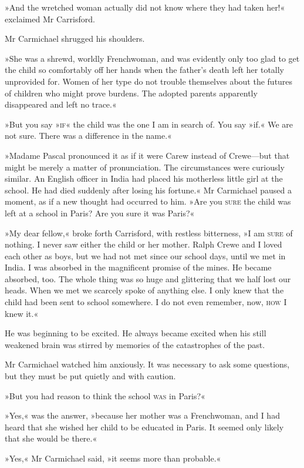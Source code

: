 »And the wretched woman actually did not know where they had taken her!« exclaimed Mr Carrisford.

Mr Carmichael shrugged his shoulders.

»She was a shrewd, worldly Frenchwoman, and was evidently only too glad to get the child so comfortably off her hands when the father's death left her totally unprovided for. Women of her type do not trouble themselves about the futures of children who might prove burdens. The adopted parents apparently disappeared and left no trace.«

»But you say »\textsc{if}« the child was the one I am in search of. You say »if.« We are not sure. There was a difference in the name.«

»Madame Pascal pronounced it as if it were Carew instead of Crewe—but that might be merely a matter of pronunciation. The circumstances were curiously similar. An English officer in India had placed his motherless little girl at the school. He had died suddenly after losing his fortune.« Mr Carmichael paused a moment, as if a new thought had occurred to him. »Are you \textsc{sure} the child was left at a school in Paris? Are you sure it was Paris?«

»My dear fellow,« broke forth Carrisford, with restless bitterness, »I am \textsc{sure} of nothing. I never saw either the child or her mother. Ralph Crewe and I loved each other as boys, but we had not met since our school days, until we met in India. I was absorbed in the magnificent promise of the mines. He became absorbed, too. The whole thing was so huge and glittering that we half lost our heads. When we met we scarcely spoke of anything else. I only knew that the child had been sent to school somewhere. I do not even remember, now, \textsc{how} I knew it.«

He was beginning to be excited. He always became excited when his still weakened brain was stirred by memories of the catastrophes of the past.

Mr Carmichael watched him anxiously. It was necessary to ask some questions, but they must be put quietly and with caution.

»But you had reason to think the school \textsc{was} in Paris?«

»Yes,« was the answer, »because her mother was a Frenchwoman, and I had heard that she wished her child to be educated in Paris. It seemed only likely that she would be there.«

»Yes,« Mr Carmichael said, »it seems more than probable.«

